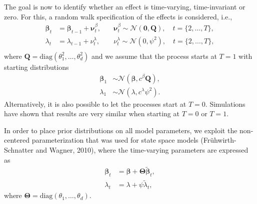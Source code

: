 \documentclass[a4paper, preprint, 3p,
authoryear]{elsarticle} %
\begin{document}
The goal is now to identify whether an effect is time-varying,
time-invariant or zero. For this, a random walk specification of the
effects is considered, i.e., \begin{equation*}
\begin{aligned}
    \boldsymbol{\beta}_t &= \boldsymbol{\beta}_{t-1} + \boldsymbol{\nu}^\beta_t, \quad &\boldsymbol{\nu}^\beta_t \sim \mathcal{N}(\textbf{0}, \textbf{Q}), \quad t= \{2,\dots,T\}, \\
    \lambda_t &= \lambda_{t-1} + \nu^\lambda_t, \quad &\nu^\lambda_t \sim \mathcal{N}(0, \psi^2), \quad t= \{2,\dots,T\},  \\    
\end{aligned}
\end{equation*} where
\(\textbf{Q} = \text{diag}(\theta^2_1,\dots,\theta^2_d)\) and we assume
that the process starts at \(T=1\) with starting distributions
\begin{equation*}
    \begin{aligned}
        \boldsymbol{\beta}_1 &\sim \mathcal{N}(\boldsymbol{\beta}, c^\beta\textbf{Q}), \\
        \lambda_1 &\sim \mathcal{N}(\lambda, c^\lambda \psi^2).
    \end{aligned}
\end{equation*} Alternatively, it is also possible to let the processes
start at \(T=0.\) Simulations have shown that results are very similar
when starting at \(T=0\) or \(T=1\).

In order to place prior distributions on all model parameters, we
exploit the non-centered parameterization that was used for state space
models (Frühwirth-Schnatter and Wagner, 2010), where the time-varying
parameters are expressed as \begin{equation*}
    \begin{aligned}
        \boldsymbol{\beta}_t &= \boldsymbol{\beta} + \boldsymbol{\Theta} \tilde{\boldsymbol{\beta}}_t, \\
        \lambda_t &= \lambda + \psi \tilde{\lambda}_t,
    \end{aligned}
\end{equation*} where
\(\boldsymbol{\Theta} = \text{diag}(\theta_1,\dots,\theta_d).\)
\end{document}
